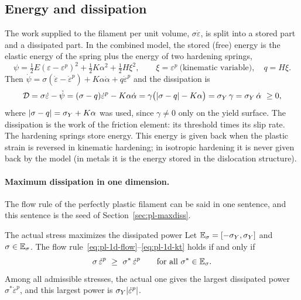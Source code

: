 \subsection{Energy and dissipation}\label{ssec:pl-1d-energy}
%
The work supplied to the filament per unit volume, $\sigma\dot\varepsilon$, is
split into a stored part and a dissipated part. In the combined model, the
stored (free) energy is the elastic energy of the spring plus the energy of
two hardening springs,
\begin{equation}\label{eq:pl-1d-psi}
  \psi=\tfrac12E(\varepsilon-\varepsilon^p)^2+\tfrac12K\alpha^2+\tfrac12H\xi^2,
  \qquad \xi=\varepsilon^p\ \text{(kinematic variable)},\quad q=H\xi .
\end{equation}
Then $\dot\psi=\sigma(\dot\varepsilon-\dot\varepsilon^p)+K\alpha\dot\alpha+q\dot\varepsilon^p$
and the dissipation is
\begin{equation}\label{eq:pl-1d-diss}
  \mathcal D=\sigma\dot\varepsilon-\dot\psi=(\sigma-q)\dot\varepsilon^p-K\alpha\dot\alpha
  =\gamma\bigl(|\sigma-q|-K\alpha\bigr)=\sY\,\gamma=\sY\,\dot\alpha\ \ge0 ,
\end{equation}
where $|\sigma-q|=\sigma_{Y}+K\alpha$ was used, since $\gamma\ne0$ only on the yield
surface. The dissipation is the work of the friction element: its threshold
times its slip rate. The hardening springs store energy. This energy is given
back when the plastic strain is reversed in kinematic hardening; in isotropic
hardening it is never given back by the model (in metals it is the energy
stored in the dislocation structure).

\paragraph{Maximum dissipation in one dimension.}
%
The flow rule of the perfectly plastic filament can be said in one sentence,
and this sentence is the seed of Section~\ref{sec:pl-maxdiss}.
\begin{gbox}{The actual stress maximizes the dissipated power}\label{prop:pl-1d-maxdiss}
Let $\mathbb{E}_{\sigma}=[-\sigma_{Y},\sigma_{Y}]$ and $\sigma\in\mathbb{E}_{\sigma}$. The flow
rule~\eqref{eq:pl-1d-flow}--\eqref{eq:pl-1d-kt} holds if and only if
\[
  \sigma\,\dot\varepsilon^p\ \ge\ \sigma^\ast\,\dot\varepsilon^p\qquad\text{for all }\sigma^\ast\in\Esig .
\]
Among all admissible stresses, the actual one gives the largest dissipated
power $\sigma^\ast\dot\varepsilon^p$, and this largest power is
$\sigma_{Y}|\dot\varepsilon^p|$.
\end{gbox}
